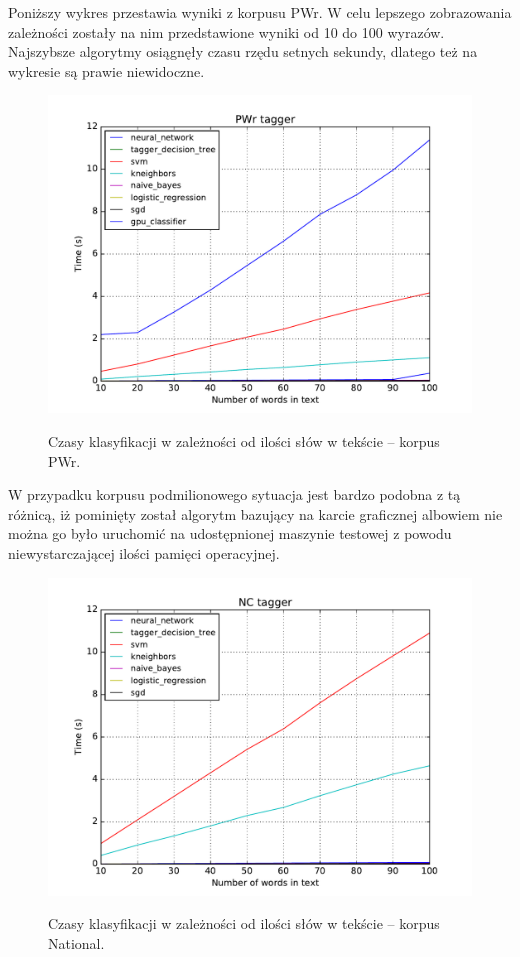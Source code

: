 Poniższy wykres przestawia wyniki z korpusu PWr. W celu lepszego zobrazowania zależności zostały na nim przedstawione wyniki od 10 do 100 wyrazów. Najszybsze algorytmy osiągnęły czasu rzędu setnych sekundy, dlatego też na wykresie są prawie niewidoczne.

\begin{figure}[H]
	\centering
	\includegraphics[width=\linewidth]{charts/czasy_pwr.pdf}
	\label{Rysunek}
	\caption{Czasy klasyfikacji w zależności od ilości słów w tekście -- korpus PWr.}
\end{figure}

W przypadku korpusu podmilionowego sytuacja jest bardzo podobna z tą różnicą, iż pominięty został algorytm bazujący na karcie graficznej albowiem nie można go było uruchomić na udostępnionej maszynie testowej z powodu niewystarczającej ilości pamięci operacyjnej.

\begin{figure}[H]
	\centering
	\includegraphics[width=\linewidth]{charts/czasy_nc.pdf}
	\label{Rysunek}
	\caption{Czasy klasyfikacji w zależności od ilości słów w tekście -- korpus National.}
\end{figure}
